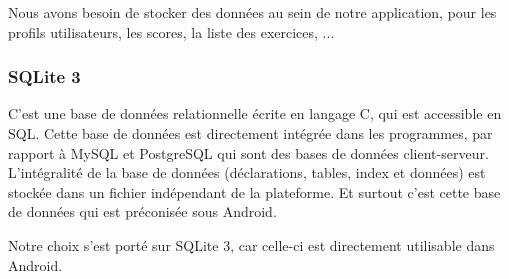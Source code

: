 Nous avons besoin de stocker des données au sein de notre application, pour les profils utilisateurs, les scores, la liste des exercices, ...


\subsubsection{SQLite 3}
C'est une base de données relationnelle écrite en langage C, qui est accessible en SQL. Cette base de données est directement intégrée dans les programmes, par rapport à MySQL et PostgreSQL qui sont des bases de données client-serveur. L'intégralité de la base de données (déclarations, tables, index et données) est stockée dans un fichier indépendant de la plateforme. Et surtout c'est cette base de données qui est préconisée sous Android.


Notre choix s'est porté sur SQLite 3, car celle-ci est directement utilisable dans Android.

